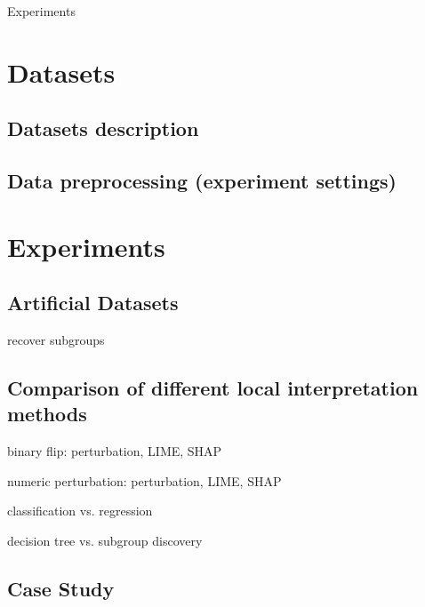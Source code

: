 Experiments


\section{Datasets}


\subsection{Datasets description}

\subsection{Data preprocessing (experiment settings)}


\section{Experiments}

\subsection{Artificial Datasets}
recover subgroups

\subsection{Comparison of different local interpretation methods}
binary flip: perturbation, LIME, SHAP

numeric perturbation: perturbation, LIME, SHAP

classification vs. regression

decision tree vs. subgroup discovery

\subsection{Case Study}
